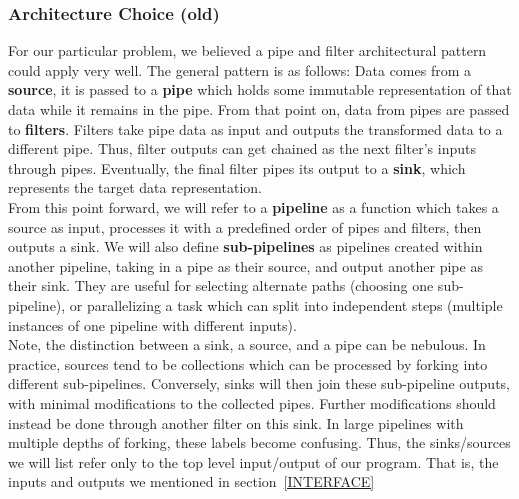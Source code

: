 \documentclass[11pt]{article}
\begin{document}
    \subsubsection{Architecture Choice (old)}
    For our particular problem, we believed a pipe and filter architectural pattern could apply very well.
    The general pattern is as follows: Data comes from a \textbf{source},
    it is passed to a \textbf{pipe} which holds some immutable representation of that data while it remains in the pipe.
    From that point on, data from pipes are passed to \textbf{filters}.
    Filters take pipe data as input and outputs the transformed data to a different pipe.
    Thus, filter outputs can get chained as the next filter's inputs through pipes.
    Eventually, the final filter pipes its output to a \textbf{sink}, which represents the target data representation.\\

    From this point forward, we will refer to a \textbf{pipeline} as a function which takes a source as input,
    processes it with a predefined order of pipes and filters, then outputs a sink.
    We will also define \textbf{sub-pipelines} as pipelines created within another pipeline,
    taking in a pipe as their source, and output another pipe as their sink.
    They are useful for selecting alternate paths (choosing one sub-pipeline),
    or parallelizing a task which can split into independent steps (multiple instances of one pipeline with different inputs).\\


    Note, the distinction between a sink, a source, and a pipe can be nebulous.
    In practice, sources tend to be collections which can be processed by forking into different sub-pipelines.
    Conversely, sinks will then join these sub-pipeline outputs, with minimal modifications to the collected pipes.
    Further modifications should instead be done through another filter on this sink.
    In large pipelines with multiple depths of forking, these labels become confusing.
    Thus, the sinks/sources we will list refer only to the top level input/output of our program.
    That is, the inputs and outputs we mentioned in section~\ref{INTERFACE}\\
\end{document}
